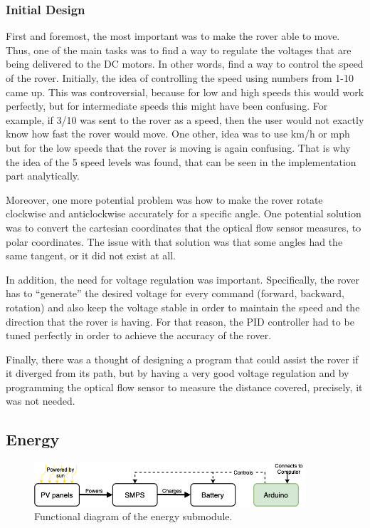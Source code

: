 \documentclass[a4paper]{article}
\begin{document}
\subsubsection{Initial Design}
First and foremost, the most important was to make the rover able to move. Thus, one of the main tasks was to find a way to regulate the voltages that are being delivered to the DC motors. In other words, find a way to control the speed of the rover. Initially, the idea of controlling the speed using numbers from 1-10 came up. This was controversial, because for low and high speeds this would work perfectly, but for intermediate speeds this might have been confusing. For example, if 3/10 was sent to the rover as a speed, then the user would not exactly know how fast the rover would move. One other, idea was to use km/h or mph but for the low speeds that the rover is moving is again confusing. That is why the idea of the 5 speed levels was found, that can be seen in the implementation part analytically. 

Moreover, one more potential problem was how to make the rover rotate clockwise and anticlockwise accurately for a specific angle. One potential solution was to convert the cartesian coordinates that the optical flow sensor measures, to polar coordinates. The issue with that solution was that some angles had the same tangent, or it did not exist at all. 

In addition, the need for voltage regulation was important. Specifically, the rover has to “generate” the desired voltage for every command (forward, backward, rotation) and also keep the voltage stable in order to maintain the speed and the direction that the rover is having. For that reason, the PID controller had to be tuned perfectly in order to achieve the accuracy of the rover.

Finally, there was a thought of designing a program that could assist the rover if it diverged from its path, but by having a very good voltage regulation and by programming the optical flow sensor to measure the distance covered, precisely, it was not needed. 


\subsection{Energy}
\vspace{-5pt}
\begin{figure}[H]
    \centering
    \includegraphics[width = 0.9\textwidth]{Functional_Diagram.png}
    \caption{Functional diagram of the energy submodule.}
\end{figure}
\end{document}

